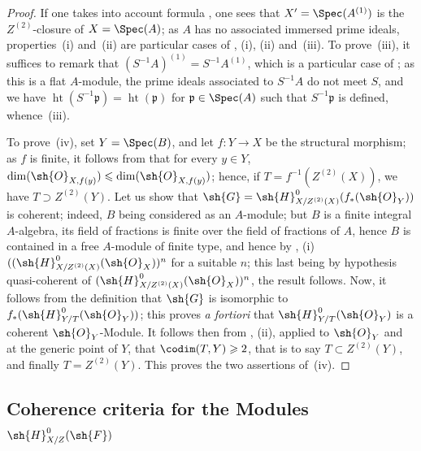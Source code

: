 \begin{proof}
If one takes into account formula , one sees that $X'=\Spec(A^{(1)})$ is the $Z^{(2)}$-closure of $X=\Spec(A)$; as $A$ has no associated immersed prime ideals, properties~(i) and~(ii) are particular cases of , (i), (ii) and~(iii).
To prove~(iii), it suffices to remark that $(S^{-1}A)^{(1)}=S^{-1}A^{(1)}$, which is a particular case of ; as this is a flat $A$-module, the prime ideals associated to $S^{-1}A$ do not meet $S$, and we have $\operatorname{ht}(S^{-1}\mathfrak{p})=\operatorname{ht}(\mathfrak{p})$ for $\mathfrak{p}\in\Spec(A)$ such that $S^{-1}\mathfrak{p}$ is defined, whence~(iii).

To prove~(iv), set $Y=\Spec(B)$, and let $f:Y\to X$ be the structural morphism; as $f$ is finite, it follows from  that for every $y\in Y$, $\dim(\sh{O}_{X,f(y)})\leqslant\dim(\sh{O}_{X,f(y)})$; hence, if $T=f^{-1}(Z^{(2)}(X))$, we have $T\supset Z^{(2)}(Y)$.
Let us show that $\sh{G}=\sh{H}^0_{X/Z^{(2)}(X)}(f_*(\sh{O}_Y))$ is coherent; indeed, $B$ being considered as an $A$-module; but $B$ is a finite integral $A$-algebra, its field of fractions is finite over the field of fractions of $A$, hence $B$ is contained in a free $A$-module of finite type, and hence by , (i) $((\sh{H}^0_{X/Z^{(2)}(X)}(\sh{O}_X))^n$ for a suitable $n$; this last being by hypothesis quasi-coherent of $(\sh{H}^0_{X/Z^{(2)}(X)}(\sh{O}_X))^n$, the result follows.
Now, it follows from the definition  that $\sh{G}$ is isomorphic to $f_*(\sh{H}^0_{Y/T}(\sh{O}_Y))$; this proves \emph{a fortiori} that $\sh{H}^0_{Y/T}(\sh{O}_Y)$ is a coherent $\sh{O}_Y$-Module.
It follows then from , (ii), applied to $\sh{O}_Y$ and at the generic point of $Y$, that $\codim(T,Y)\geqslant 2$, that is to say $T\subset Z^{(2)}(Y)$, and finally $T=Z^{(2)}(Y)$.
This proves the two assertions of~(iv).
\end{proof}

\subsection{Coherence criteria for the Modules \texorpdfstring{$\sh{H}^0_{X/Z}(\sh{F})$}{H\^{}0\_\{X/Z\}(F)}}
\label{subsection:IV.5.11}

